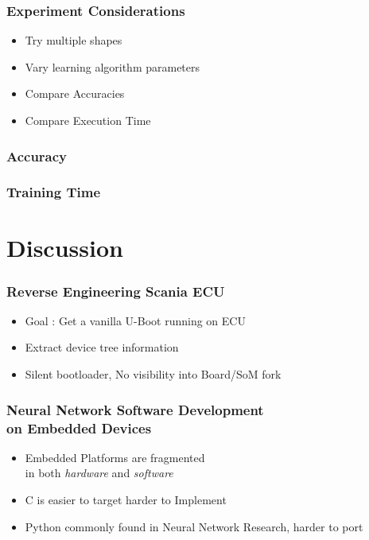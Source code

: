 \documentclass{beamer}
\begin{document}
\begin{frame}
  \frametitle{Experiment Considerations}

  \begin{itemize}
    \item Try multiple shapes
    \item Vary learning algorithm parameters
    \item Compare Accuracies
    \item Compare Execution Time
  \end{itemize}

\end{frame}

\begin{frame}
  \frametitle{Accuracy}

  \begin{figure}[!ht]
    \centering
    \scalebox{0.52}{
      }
  \end{figure}

\end{frame}

\begin{frame}
  \frametitle{Training Time}

  \begin{figure}[!ht]
    \centering
    \resizebox{\columnwidth}{!}{%
    }
  \end{figure}

\end{frame}

\section{Discussion}

\begin{frame}
  \frametitle{Reverse Engineering Scania ECU}

  \begin{itemize}
    \item Goal : Get a vanilla U-Boot running on ECU
    \item Extract device tree information
    \item Silent bootloader, No visibility into Board/SoM fork
  \end{itemize}

\end{frame}

\begin{frame}
  \frametitle{Neural Network Software Development \\ on Embedded Devices}

  \begin{itemize}
    \item Embedded Platforms are fragmented \\ in both \textit{hardware} and \textit{software}
    \item C is easier to target harder to Implement
    \item Python commonly found in Neural Network Research, harder to port
  \end{itemize}

\end{frame}
\end{document}
